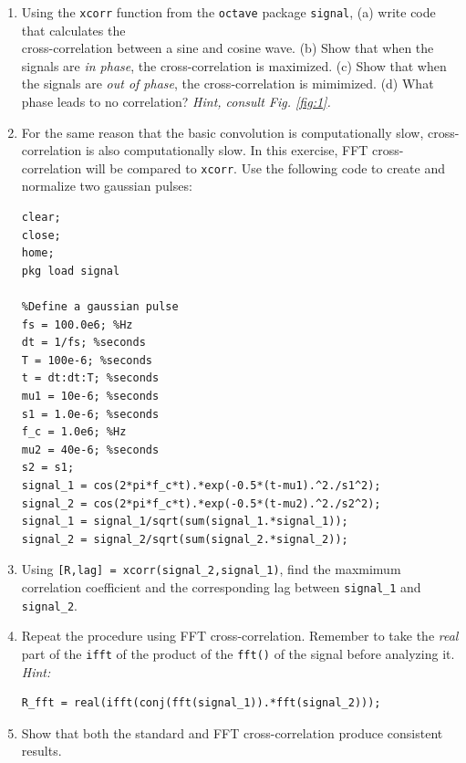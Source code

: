 \documentclass{article}
\begin{document}
\begin{enumerate}
\item Using the \verb+xcorr+ function from the \verb+octave+ package \verb+signal+, (a) write code that calculates the \\ cross-correlation between a sine and cosine wave. (b) Show that when the signals are \textit{in phase}, the cross-correlation is maximized. (c) Show that when the signals are \textit{out of phase}, the cross-correlation is mimimized. (d) What phase leads to no correlation? \textit{Hint, consult Fig. \ref{fig:1}.}
\item For the same reason that the basic convolution is computationally slow, cross-correlation is also computationally slow.  In this exercise, FFT cross-correlation will be compared to \verb+xcorr+.  Use the following code to create and normalize two gaussian pulses:
\small
\begin{verbatim}
clear;
close;
home;
pkg load signal

%Define a gaussian pulse
fs = 100.0e6; %Hz
dt = 1/fs; %seconds
T = 100e-6; %seconds
t = dt:dt:T; %seconds
mu1 = 10e-6; %seconds
s1 = 1.0e-6; %seconds
f_c = 1.0e6; %Hz
mu2 = 40e-6; %seconds
s2 = s1;
signal_1 = cos(2*pi*f_c*t).*exp(-0.5*(t-mu1).^2./s1^2);
signal_2 = cos(2*pi*f_c*t).*exp(-0.5*(t-mu2).^2./s2^2);
signal_1 = signal_1/sqrt(sum(signal_1.*signal_1));
signal_2 = signal_2/sqrt(sum(signal_2.*signal_2));
\end{verbatim}
\normalsize
\item Using \verb+[R,lag] = xcorr(signal_2,signal_1)+, find the maxmimum correlation coefficient and the corresponding lag between \verb+signal_1+ and \verb+signal_2+.
\item Repeat the procedure using FFT cross-correlation.  Remember to take the \textit{real} part of the \verb+ifft+ of the product of the \verb+fft()+ of the signal before analyzing it. \textit{Hint:}
\small
\begin{verbatim}
R_fft = real(ifft(conj(fft(signal_1)).*fft(signal_2)));
\end{verbatim}
\item Show that both the standard and FFT cross-correlation produce consistent results.
\end{enumerate}
\end{document}
